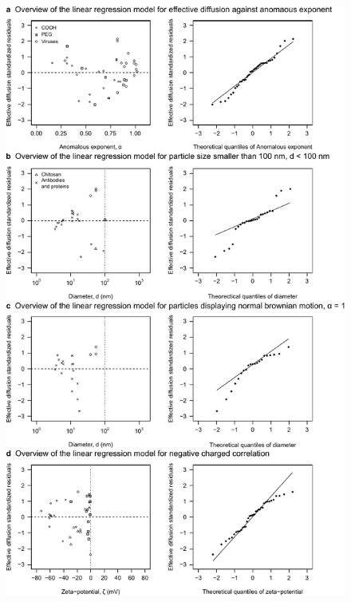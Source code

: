 \documentclass[a4paper]{article}
\begin{document}
\begin{figure}[H]
    \centering
    \includegraphics[width = 12 cm]{Figure_Indepth_SLR_analysis.pdf}
    \label{fig:IndepthSLRAna}
\end{figure}
\end{document}
